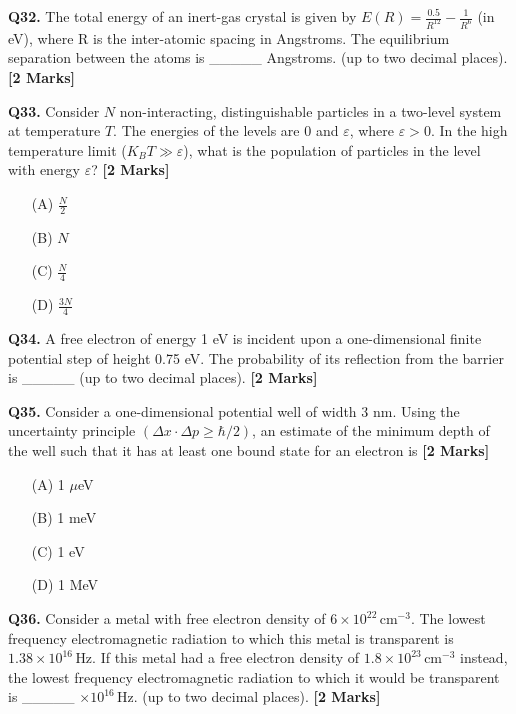 \documentclass[11pt]{article}
\newcommand{\questionb}[2]{
    \noindent\textbf{Q#2.} #1 \hfill \textbf{[2 Marks]}
}
\begin{document}
\questionb{The total energy of an inert-gas crystal is given by \( E(R) = \frac{0.5}{R^{12}} - \frac{1}{R^6} \) (in eV), where R is the inter-atomic spacing in Angstroms. The equilibrium separation between the atoms is \_\_\_\_\_ Angstroms. (up to two decimal places).}{32}
\vspace{0.5cm}

\questionb{Consider \( N \) non-interacting, distinguishable particles in a two-level system at temperature \( T \). The energies of the levels are 0 and \( \varepsilon \), where \( \varepsilon > 0 \). In the high temperature limit (\( K_B T \gg \varepsilon \)), what is the population of particles in the level with energy \( \varepsilon \)?}{33}
\begin{enumerate}
    \item[(A)] \(\frac{N}{2}\)
    \item[(B)] \(N\)
    \item[(C)] \(\frac{N}{4}\)
    \item[(D)] \(\frac{3N}{4}\)
\end{enumerate}
\vspace{0.5cm}

\questionb{A free electron of energy 1 eV is incident upon a one-dimensional finite potential step of height 0.75 eV. The probability of its reflection from the barrier is \_\_\_\_\_ (up to two decimal places).}{34}
\vspace{0.5cm}

\questionb{Consider a one-dimensional potential well of width 3 nm. Using the uncertainty principle \(\left( \Delta x \cdot \Delta p \geq \hbar / 2 \right)\), an estimate of the minimum depth of the well such that it has at least one bound state for an electron is}{35}
\begin{enumerate}
    \item[(A)] 1 \(\mu\)eV
    \item[(B)] 1 meV
    \item[(C)] 1 eV
    \item[(D)] 1 MeV
\end{enumerate}
\vspace{0.5cm}

\questionb{Consider a metal with free electron density of \( 6 \times 10^{22} \, \text{cm}^{-3} \). The lowest frequency electromagnetic radiation to which this metal is transparent is \( 1.38 \times 10^{16} \, \text{Hz} \). If this metal had a free electron density of \( 1.8 \times 10^{23} \, \text{cm}^{-3} \) instead, the lowest frequency electromagnetic radiation to which it would be transparent is \_\_\_\_\_ \(\times 10^{16} \, \text{Hz} \). (up to two decimal places).}{36}
\vspace{0.5cm}
\end{document}
